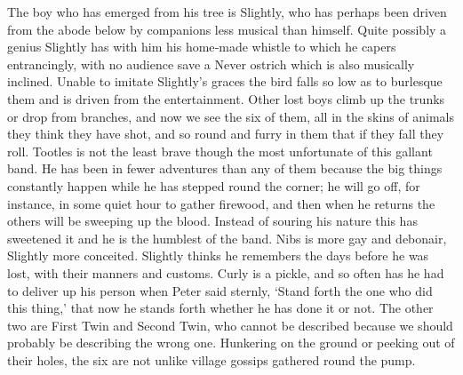 \begin{stagedir}
The boy who has emerged from his tree is Slightly,
who has perhaps been driven from the abode below by companions less musical than himself.
Quite possibly a genius Slightly has with him his home‐made whistle to which he capers entrancingly,
with no audience save a Never ostrich which is also musically inclined.
Unable to imitate Slightly’s graces the bird falls so low as to burlesque them
and is driven from the entertainment.
Other lost boys climb up the trunks or drop from branches,
and now we see the six of them, all in the skins of animals they think they have shot,
and so round and furry in them that if they fall they roll.
Tootles is not the least brave though the most unfortunate of this gallant band.
He has been in fewer adventures than any of them
because the big things constantly happen while he has stepped round the corner;
he will go off, for instance, in some quiet hour to gather firewood,
and then when he returns the others will be sweeping up the blood.
Instead of souring his nature this has sweetened it and he is the humblest of the band.
Nibs is more gay and debonair, Slightly more conceited.
Slightly thinks he remembers the days before he was lost, with their manners and customs.
Curly is a pickle, and so often has he had to deliver up his person when Peter said sternly,
‘Stand forth the one who did this thing,’ that now he stands forth whether he has done it or not.
The other two are First Twin and Second Twin,
who cannot be described because we should probably be describing the wrong one.
Hunkering on the ground or peeking out of their holes,
the six are not unlike village gossips gathered round the pump.
\end{stagedir}

